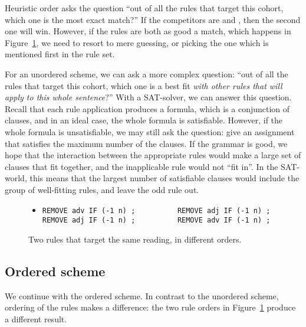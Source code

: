 Heuristic order asks the question ``out of all the rules that target this cohort, which one is the most exact match?'' If the competitors are  and , then the second one will win. However, if the rules are both as good a match, which happens in Figure~\ref{fig:orderMatters}, we need to resort to mere guessing, or picking the one which is mentioned first in the rule set.

For an unordered scheme, we can ask a more complex question: ``out of all the rules that target this cohort, which one is a best fit \emph{with other rules that will apply to this whole sentence}?''
With a SAT-solver, we can answer this question. Recall that each rule application produces a formula, which is a conjunction of clauses, and in an ideal case, the whole formula is satisfiable. However, if the whole formula is unsatisfiable, we may still ask the question: give an assignment that satisfies the maximum number of the clauses. 
If the grammar is good, we hope that the interaction between the appropriate
rules would make a large set of clauses that fit together, and the
inapplicable rule would not ``fit in''.
In the SAT-world, this means that the largest number of satisfiable clauses would include the group of well-fitting rules, and leave the odd rule out.




\begin{figure}
  \begin{itemize}
   \item[] \begin{verbatim}REMOVE adv IF (-1 n) ;          REMOVE adj IF (-1 n) ;
REMOVE adj IF (-1 n) ;          REMOVE adv IF (-1 n) ;\end{verbatim}
   \end{itemize}
   \caption{Two rules that target the same reading, in different orders.}
   \label{fig:orderMatters}
\end{figure}

\subsection{Ordered scheme}

We continue with the ordered scheme. In contrast to the unordered scheme, ordering of the rules makes a difference: the two rule orders in Figure~\ref{fig:orderMatters} produce a different result.

